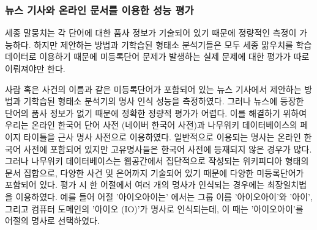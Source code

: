 \documentclass[11pt]{article}
\begin{document}
\begin{table}[ht]
\centering
\caption{세종 말뭉치에서 명사로 추출된 빈도수가 작은 12 개의 명사 예시 (로지스틱 리그레션의 판별 확률, 출현 빈도수)}
\label{tab:sejong_infrequent}
\end{table}

\begin{table}[ht]
\centering
\caption{세종 말뭉치에서 명사로 추출된 12 개의 명사 예시 (정렬 기준 = 판별 확률 $\times$ 출현 빈도수)}
\label{tab:sejong_frequent}
\end{table}


\subsubsection{뉴스 기사와 온라인 문서를 이용한 성능 평가}

세종 말뭉치는 각 단어에 대한 품사 정보가 기술되어 있기 때문에 정량적인 측정이 가능하다.
하지만 제안하는 방법과 기학습된 형태소 분석기들은 모두 세종 맒우치를 학습 데이터로 이용하기 때문에 미등록단어 문제가 발생하는 실제 문제에 대한 평가가 따로 이뤄져야만 한다.

사람 혹은 사건의 이름과 같은 미등록단어가 포함되어 있는 뉴스 기사에서 제안하는 방법과 기학습된 형태소 분석기의 명사 인식 성능을 측정하였다.
그러나 뉴스에 등장한 단어의 품사 정보가 없기 때문에 정확한 정량적 평가가 어렵다.
이를 해결하기 위하여 우리는 온라인 한국어 단어 사전 (네이버 한국어 사전)과 나무위키 데이터베이스의 페이지 타이틀을 근사 명사 사전으로 이용하였다.
일반적으로 이용되는 명사는 온라인 한국어 사전에 포함되어 있지만 고유명사들은 한국어 사전에 등재되지 않은 경우가 많다.
그러나 나무위키 데이터베이스는 웹공간에서 집단적으로 작성되는 위키피디아 형태의 문서 집합으로, 다양한 사건 및 은어까지 기술되어 있기 때문에 다양한 미등록단어가 포함되어 있다.
평가 시 한 어절에서 여러 개의 명사가 인식되는 경우에는 최장일치법을 이용하였다.
예를 들어 어절 '아이오아이는' 에서는 그룹 이름 '아이오아이'와 '아이', 그리고 컴퓨터 도메인의 '아이오 (IO)'가 명사로 인식되는데, 이 때는 '아이오아이'를 어절의 명사로 선택하였다.
\end{document}
